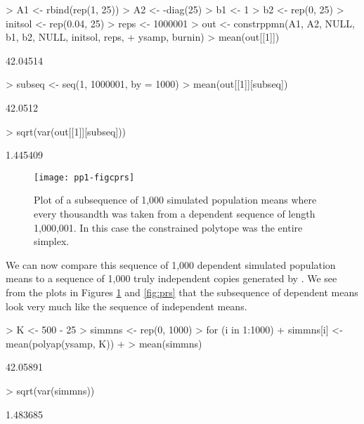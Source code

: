 \documentclass{article}
\begin{document}
\begin{Schunk}
\begin{Sinput}
> A1 <- rbind(rep(1, 25))
> A2 <- -diag(25)
> b1 <- 1
> b2 <- rep(0, 25)
> initsol <- rep(0.04, 25)
> reps <- 1000001
> out <- constrppmn(A1, A2, NULL, b1, b2, NULL, initsol, reps, 
+     ysamp, burnin)
> mean(out[[1]])
\end{Sinput}
\begin{Soutput}
[1] 42.04514
\end{Soutput}
\begin{Sinput}
> subseq <- seq(1, 1000001, by = 1000)
> mean(out[[1]][subseq])
\end{Sinput}
\begin{Soutput}
[1] 42.0512
\end{Soutput}
\begin{Sinput}
> sqrt(var(out[[1]][subseq]))
\end{Sinput}
\begin{Soutput}
[1] 1.445409
\end{Soutput}
\end{Schunk}

\begin{figure}
\begin{center}
\texttt{[image: pp1-figcprs]}
\end{center}
\caption{Plot of a subsequence of 1,000 simulated  population 
means where every thousandth was taken 
from a dependent sequence of length 1,000,001.  
In this case the constrained polytope was the entire simplex.}
\label{fig:cprs}
\end{figure}

We can now compare this sequence of 1,000  dependent simulated population
 means to a sequence of 1,000 truly independent copies generated by 
\verb@polyap@. We see from the plots in Figures \ref{fig:cprs} and 
\ref{fig:prs} that the subsequence of dependent means look very much 
like the sequence of independent means.

\begin{Schunk}
\begin{Sinput}
> K <- 500 - 25
> simmns <- rep(0, 1000)
> for (i in 1:1000) {
+     simmns[i] <- mean(polyap(ysamp, K))
+ }
> mean(simmns)
\end{Sinput}
\begin{Soutput}
[1] 42.05891
\end{Soutput}
\begin{Sinput}
> sqrt(var(simmns))
\end{Sinput}
\begin{Soutput}
[1] 1.483685
\end{Soutput}
\end{Schunk}
\end{document}
